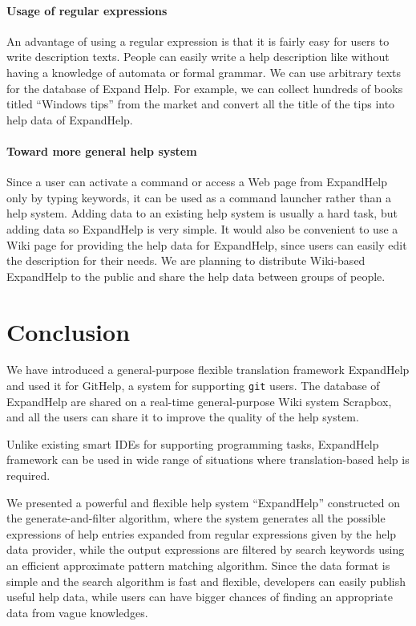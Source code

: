 \documentclass{sigchi}
\def\GH{\textsf{GitHelp}}
\def\SB{\textsf{Scrapbox}}
\def\EH{\textsf{ExpandHelp}}
\def\GIT{\texttt{git}}
\begin{document}
\paragraph{Usage of regular expressions}

An advantage of using a regular expression is that
it is fairly easy for users to write description texts.
People can easily write a help description like
without having a knowledge of automata or formal grammar.
We can use arbitrary texts for the database of Expand Help.
For example,
we can collect hundreds of books titled ``Windows tips'' from the market
and convert all the title of the tips into help data of ExpandHelp.

\paragraph{Toward more general help system}

Since a user can activate a command or access a Web page
from ExpandHelp only by typing keywords,
it can be used as a command launcher rather than a help system.
Adding data to an existing help system is usually a hard task,
but adding data so ExpandHelp is very simple.
It would also be convenient to use a Wiki page for providing the help
data for ExpandHelp, since users can easily edit the description
for their needs.
We are planning to distribute Wiki-based ExpandHelp to the public and
share the help data between groups of people.

\section{Conclusion}

We have introduced a general-purpose flexible translation framework {\EH}
and used it for {\GH}, a system for supporting {\GIT} users.
%
The database of {\EH} are shared on a real-time general-purpose Wiki system {\SB},
and all the users can share it to improve the quality of the help system.

Unlike existing smart IDEs for supporting programming tasks,
{\EH} framework can be used in wide range of situations
where translation-based help is required.

We presented a powerful and flexible help system ``ExpandHelp''
constructed on the generate-and-filter algorithm, where
the system generates all the possible expressions of
help entries expanded from regular expressions given by the help data provider,
while the output expressions are filtered by search keywords using
an efficient approximate pattern matching algorithm.
Since the data format is simple and the search algorithm is fast and flexible,
developers can easily publish useful help data, while
users can have bigger chances of finding an appropriate
data from vague knowledges.



\end{document}
